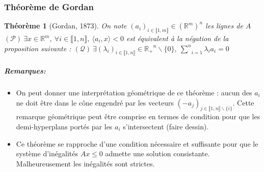 \documentclass[10pt,a4paper]{article}
\newtheorem{thm}{Théorème}
\begin{document}
\subsubsection{Théorème de Gordan}
\begin{thm}[Gordan, 1873]
  On note $(a_i)_{i \in \llbracket 1,m \rrbracket} \in \left(\mathbb{R}^m \right)^n$ les lignes de $A$
  $(\mathcal{P}) \  \exists x \in \mathbb{R}^m, \ \forall i \in \llbracket 1,n \rrbracket, \ \langle a_i,x \rangle <0$ est équivalent à la négation de la proposition suivante : $ (\mathcal{Q}) \ \exists (\lambda_i)_{i \in \llbracket 1,n \rrbracket}\in \mathbb{R_+}^n \backslash\lbrace 0\rbrace, \ \underset{i=1}{\overset{n}{\sum}} \lambda_i a_i=0$
\end{thm}
\subparagraph{Remarques:}
\begin{itemize}
  \item
    On peut donner une interprétation géométrique de ce théorème : aucun des $a_i$ ne doit être dans le cône engendré par les vecteurs $(-a_j)_{j \in \llbracket 1,n \rrbracket \backslash \lbrace i \rbrace}$.
    Cette remarque géométrique peut être comprise en termes de condition pour que les demi-hyperplans portés par les $a_i$ s'intersectent (faire dessin).
  \item
    Ce théorème se rapproche d'une condition nécessaire et suffisante pour que le système d'inégalités $Ax \leq 0$ admette une solution consistante.
    Malheureusement les inégalités sont strictes.
\end{itemize}
\end{document}
